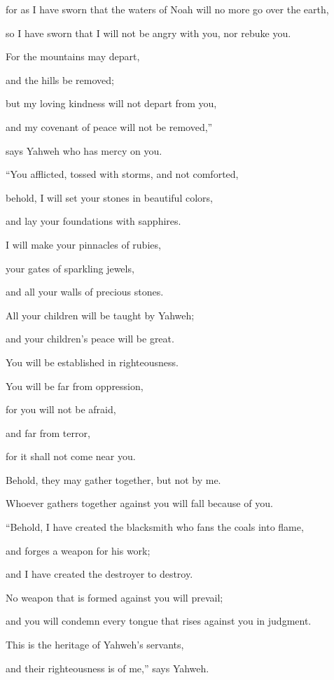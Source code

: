 {\par }{\QB for as I have sworn that the waters of Noah will no more go over the earth,
\par }{\QB so I have sworn that I will not be angry with you, nor rebuke you.
\par }{\Q {}For the mountains may depart,
\par }{\QB and the hills be removed;
\par }{\Q but my loving kindness will not depart from you,
\par }{\QB and my covenant of peace will not be removed,”
\par }{\QB says Yahweh who has mercy on you.
\par }{\BB \par }{\Q {}“You afflicted, tossed with storms, and not comforted,
\par }{\QB behold, I will set your stones in beautiful colors,
\par }{\QB and lay your foundations with sapphires.
\par }{\Q {}I will make your pinnacles of rubies,
\par }{\QB your gates of sparkling jewels,
\par }{\QB and all your walls of precious stones.
\par }{\Q {}All your children will be taught by Yahweh;
\par }{\QB and your children’s peace will be great.
\par }{\Q {}You will be established in righteousness.
\par }{\QB You will be far from oppression,
\par }{\QB for you will not be afraid,
\par }{\QB and far from terror,
\par }{\QB for it shall not come near you.
\par }{\Q {}Behold, they may gather together, but not by me.
\par }{\QB Whoever gathers together against you will fall because of you.
\par }{\BB \par }{\Q {}“Behold, I have created the blacksmith who fans the coals into flame,
\par }{\QB and forges a weapon for his work;
\par }{\QB and I have created the destroyer to destroy.
\par }{\Q {}No weapon that is formed against you will prevail;
\par }{\QB and you will condemn every tongue that rises against you in judgment.
\par }{\Q This is the heritage of Yahweh’s servants,
\par }{\QB and their righteousness is of me,” says Yahweh.

}
